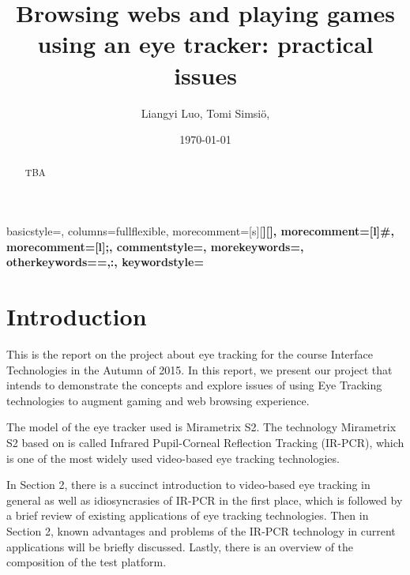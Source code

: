 \documentclass[english]{tktltiki}
\begin{document}
\onehalfspacing

{
    basicstyle=\ttfamily\small\singlespacing,
    columns=fullflexible,
    morecomment=[s][\color{Orchid}\bfseries]{[}{]},
    morecomment=[l]{\#},
    morecomment=[l]{;},
    commentstyle=\color{gray}\ttfamily,
    morekeywords={},
    otherkeywords={=,:},
    keywordstyle={\color{red}\bfseries}
}

\title{Browsing webs and playing games using an eye tracker: practical issues}
\author{Liangyi Luo, Tomi Simsiö, }
\date{\today}

\maketitle


\keywords{ }

\begin{abstract}

TBA

\end{abstract}

\mytableofcontents




\section{Introduction}

This is the report on the project about eye tracking for the course Interface Technologies in the Autumn of 2015. In this report, we present our project that intends to demonstrate the concepts and explore issues of using Eye Tracking technologies to augment gaming and web browsing experience.  

The model of the eye tracker used is Mirametrix S2. The technology Mirametrix S2 based on is called Infrared Pupil-Corneal Reflection Tracking (IR-PCR), which is one of the most widely used video-based eye tracking technologies. 

In Section 2, there is a succinct introduction to video-based eye tracking in general as well as idiosyncrasies of IR-PCR in the first place, which is followed by a brief review of existing applications of eye tracking technologies. Then in Section 2, known advantages and problems of the IR-PCR technology in current applications will be briefly discussed. Lastly, there is an overview of the composition of the test platform.
\end{document}

